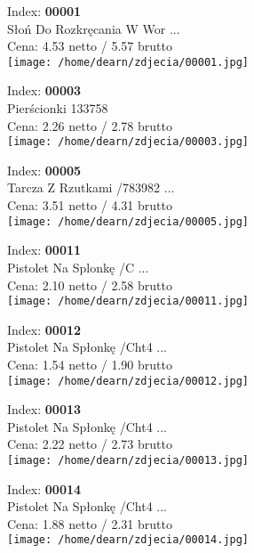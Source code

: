 
{Index: \textbf{00001}\\
Słoń Do Rozkręcania W Wor ...\\
Cena: 4.53 netto / 5.57 brutto\\
  \texttt{[image: /home/dearn/zdjecia/00001.jpg]}}\newline\newline

{Index: \textbf{00003}\\
Pierścionki 133758\\
Cena: 2.26 netto / 2.78 brutto\\
  \texttt{[image: /home/dearn/zdjecia/00003.jpg]}}\newline\newline

{Index: \textbf{00005}\\
Tarcza Z Rzutkami /783982 ...\\
Cena: 3.51 netto / 4.31 brutto\\
  \texttt{[image: /home/dearn/zdjecia/00005.jpg]}}\newline\newline

{Index: \textbf{00011}\\
Pistolet Na Splonkę    /C ...\\
Cena: 2.10 netto / 2.58 brutto\\
  \texttt{[image: /home/dearn/zdjecia/00011.jpg]}}\newline\newline

{Index: \textbf{00012}\\
Pistolet Na Spłonkę /Cht4 ...\\
Cena: 1.54 netto / 1.90 brutto\\
  \texttt{[image: /home/dearn/zdjecia/00012.jpg]}}\newline\newline

{Index: \textbf{00013}\\
Pistolet Na Spłonkę /Cht4 ...\\
Cena: 2.22 netto / 2.73 brutto\\
  \texttt{[image: /home/dearn/zdjecia/00013.jpg]}}\newline\newline

{Index: \textbf{00014}\\
Pistolet Na Spłonkę /Cht4 ...\\
Cena: 1.88 netto / 2.31 brutto\\
  \texttt{[image: /home/dearn/zdjecia/00014.jpg]}}\newline\newline

